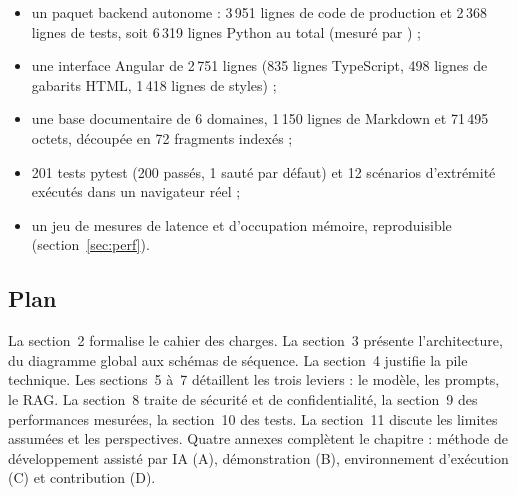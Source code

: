 \begin{itemize}[leftmargin=1.6em,itemsep=1pt,topsep=2pt]
  \item un paquet backend autonome  : 3\,951 lignes de
        code de production et 2\,368 lignes de tests, soit 6\,319 lignes Python
        au total (mesuré par ) ;
  \item une interface Angular de 2\,751 lignes (835 lignes TypeScript,
        498 lignes de gabarits HTML, 1\,418 lignes de styles) ;
  \item une base documentaire de 6 domaines, 1\,150 lignes de Markdown et
        71\,495 octets, découpée en 72 fragments indexés ;
  \item 201 tests pytest (200 passés, 1 sauté par défaut) et 12 scénarios
        d'extrémité exécutés dans un navigateur réel ;
  \item un jeu de mesures de latence et d'occupation mémoire, reproduisible
        (section~\ref{sec:perf}).
\end{itemize}

\subsection{Plan}

La section~2 formalise le cahier des charges. La section~3 présente
l'architecture, du diagramme global aux schémas de séquence. La section~4
justifie la pile technique. Les sections~5 à~7 détaillent les trois leviers :
le modèle, les prompts, le RAG. La section~8 traite de sécurité et de
confidentialité, la section~9 des performances mesurées, la section~10 des
tests. La section~11 discute les limites assumées et les perspectives.
Quatre annexes complètent le chapitre : méthode de développement assisté par
IA (A), démonstration (B), environnement d'exécution (C) et contribution
(D).
